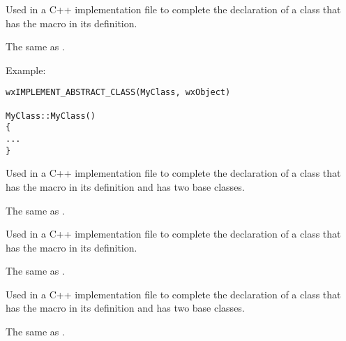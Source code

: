 
Used in a C++ implementation file to complete the 
declaration of a class that has the
macro in its definition.
 
The same as .

Example:

\begin{verbatim}
wxIMPLEMENT_ABSTRACT_CLASS(MyClass, wxObject)

MyClass::MyClass()
{
...
}
\end{verbatim}


\label{wximplementabstractclass2}


Used in a C++ implementation file to complete the declaration of
a class that has the 
macro in its definition and has two base classes. 

The same as .


\label{wximplementclass}


Used in a C++ implementation file to complete the declaration of
a class that has the
macro in its definition.

The same as .


\label{wximplementclass2}


Used in a C++ implementation file to complete the declaration of a
class that has the
macro in its definition and has two base classes.

The same as .


\label{wximplementdynamicclass}


